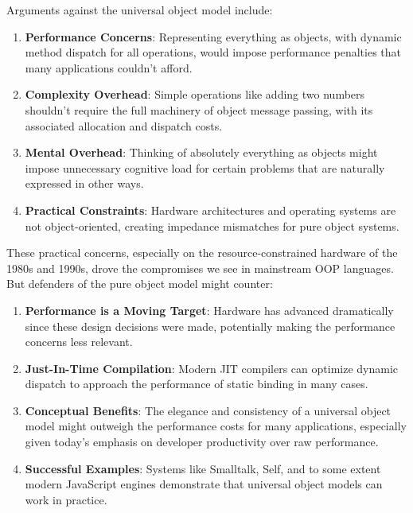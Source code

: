 \documentclass[11pt]{article}
\begin{document}
Arguments against the universal object model include:

\begin{enumerate}
\item \textbf{Performance Concerns}: Representing everything as objects, with dynamic method dispatch for all operations, would impose performance penalties that many applications couldn't afford.

\item \textbf{Complexity Overhead}: Simple operations like adding two numbers shouldn't require the full machinery of object message passing, with its associated allocation and dispatch costs.

\item \textbf{Mental Overhead}: Thinking of absolutely everything as objects might impose unnecessary cognitive load for certain problems that are naturally expressed in other ways.

\item \textbf{Practical Constraints}: Hardware architectures and operating systems are not object-oriented, creating impedance mismatches for pure object systems.
\end{enumerate}

These practical concerns, especially on the resource-constrained hardware of the 1980s and 1990s, drove the compromises we see in mainstream OOP languages. But defenders of the pure object model might counter:

\begin{enumerate}
\item \textbf{Performance is a Moving Target}: Hardware has advanced dramatically since these design decisions were made, potentially making the performance concerns less relevant.

\item \textbf{Just-In-Time Compilation}: Modern JIT compilers can optimize dynamic dispatch to approach the performance of static binding in many cases.

\item \textbf{Conceptual Benefits}: The elegance and consistency of a universal object model might outweigh the performance costs for many applications, especially given today's emphasis on developer productivity over raw performance.

\item \textbf{Successful Examples}: Systems like Smalltalk, Self, and to some extent modern JavaScript engines demonstrate that universal object models can work in practice.
\end{enumerate}
\end{document}
